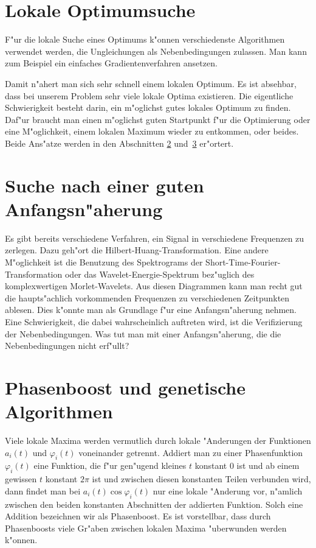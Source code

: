 \documentclass[a4paper]{scrartcl}
\newcommand{\pphi}{{\varphi}}
\begin{document}
\section{Lokale Optimumsuche} \label{sec:gradients}

F"ur die lokale Suche eines Optimums k"onnen verschiedenste Algorithmen verwendet werden, die Ungleichungen als Nebenbedingungen zulassen. Man kann zum Beispiel ein einfaches Gradientenverfahren ansetzen. 

Damit n"ahert man sich sehr schnell einem lokalen Optimum. Es ist absehbar, dass bei unserem Problem sehr viele lokale Optima existieren. Die eigentliche Schwierigkeit besteht darin, ein m"oglichst gutes lokales Optimum zu finden. Daf"ur braucht man einen m"oglichst guten Startpunkt f"ur die Optimierung oder eine M"oglichkeit, einem lokalen Maximum wieder zu entkommen, oder beides. Beide Ans"atze werden in den Abschnitten \ref{sec:initialval} und~\ref{sec:jumps} er"ortert. 


\section{Suche nach einer guten Anfangsn"aherung} \label{sec:initialval}

Es gibt bereits verschiedene Verfahren, ein Signal in verschiedene Frequenzen zu zerlegen. Dazu geh"ort die Hilbert-Huang-Transformation. Eine andere M"oglichkeit ist die Benutzung des Spektrograms der Short-Time-Fourier-Transformation oder das Wavelet-Energie-Spektrum bez"uglich des komplexwertigen Morlet-Wavelets. Aus diesen Diagrammen kann man recht gut die haupts"achlich vorkommenden Frequenzen zu verschiedenen Zeitpunkten ablesen. Dies k"onnte man als Grundlage f"ur eine Anfangsn"aherung nehmen. Eine Schwierigkeit, die dabei wahrscheinlich auftreten wird, ist die Verifizierung der Nebenbedingungen. Was tut man mit einer Anfangsn"aherung, die die Nebenbedingungen nicht erf"ullt?


\section{Phasenboost und genetische Algorithmen} \label{sec:jumps}

Viele lokale Maxima werden vermutlich durch lokale "Anderungen der Funktionen $a_i(t)$ und $\pphi_i(t)$ voneinander getrennt. Addiert man zu einer Phasenfunktion $\pphi_i(t)$ eine Funktion, die f"ur gen"ugend kleines $t$ konstant $0$ ist und ab einem gewissen $t$ konstant $2\pi$ ist und zwischen diesen konstanten Teilen verbunden wird, dann findet man bei $a_i(t)\cos\pphi_i(t)$ nur eine lokale "Anderung vor, n"amlich zwischen den beiden konstanten Abschnitten der addierten Funktion. Solch eine Addition bezeichnen wir als Phasenboost. Es ist vorstellbar, dass durch Phasenboosts viele Gr"aben zwischen lokalen Maxima "uberwunden werden k"onnen. 
\end{document}
